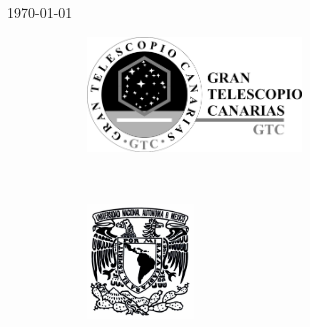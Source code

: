 \begin{titlepage}

{\large \today}\\[2cm] %


\begin{figure}[h]
    \centering
    \begin{subfigure}[b]{0.5\textwidth}
        \centering
        \includegraphics[height=1.2in]{gtc}
    \end{subfigure}%
    ~ 
    \begin{subfigure}[b]{0.5\textwidth}
        \centering
        \includegraphics[height=1.2in]{unam}
    \end{subfigure}
\end{figure}
 

\vfill %

\end{titlepage}


\printacronyms
